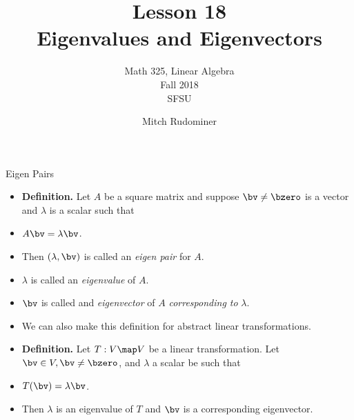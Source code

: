 \documentclass{beamer}
\title{Lesson 18 \\ Eigenvalues and Eigenvectors}
\subtitle{Math 325, Linear Algebra \\ Fall 2018 \\ SFSU}
\author{Mitch Rudominer}
\date{}
\begin{document}
\begin{frame}
  \titlepage
\end{frame}


\begin{frame}{Eigen Pairs}

\begin{itemize}
\item \textbf{Definition.} Let $A$ be a square matrix and suppose $\bv\not=\bzero$ is a vector and $\lambda$ is a scalar such that
\item $A\bv=\lambda\bv$.
\item Then $\left(\lambda, \bv \right)$ is called an \emph{eigen pair} for $A$.
\item $\lambda$ is called an \emph{eigenvalue} of $A$.
\item $\bv$ is called and \emph{eigenvector} of $A$ \emph{corresponding to} $\lambda$.
\item We can also make this definition for abstract linear transformations.
\item \textbf{Definition.} Let $T:V\map V$ be a linear transformation. Let $\bv\in V, \bv\not=\bzero$, and $\lambda$ a scalar be such that
\item $T(\bv)=\lambda\bv$.
\item Then $\lambda$ is an eigenvalue of $T$  and $\bv$ is a corresponding eigenvector.
\end{itemize}
\end{frame}

\end{document}
